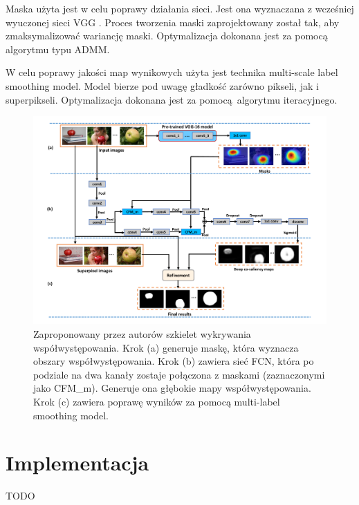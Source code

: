 \documentclass[a4paper,11pt, notitlepage, twosides, openany ]{report}
\begin{document}
	Maska użyta jest w celu poprawy działania sieci. Jest ona wyznaczana z wcześniej wyuczonej sieci VGG \cite{SimonyanZ14a}. Proces tworzenia maski zaprojektowany został tak, aby zmaksymalizować wariancję maski. Optymalizacja dokonana jest za pomocą algorytmu typu ADMM.

	W celu poprawy jakości map wynikowych użyta jest technika multi-scale label smoothing model. Model bierze pod uwagę gładkość zarówno pikseli, jak i superpikseli. Optymalizacja dokonana jest za pomocą algorytmu iteracyjnego.

	\begin{figure}[h!]
		\centering
		\includegraphics[width=1\textwidth]{fram.png}
		\caption{Zaproponowany przez autorów szkielet wykrywania współwystępowania. Krok (a) generuje maskę, która wyznacza obszary współwystępowania. Krok (b) zawiera sieć FCN, która po podziale na dwa kanały zostaje połączona z maskami (zaznaczonymi jako CFM\_m). Generuje ona głębokie mapy współwystępowania. Krok (c) zawiera poprawę wyników za pomocą multi-label smoothing model.}
		\label{fram}
	\end{figure}

	\section{Implementacja}
	TODO

	
	
	
	

	
\end{document}

